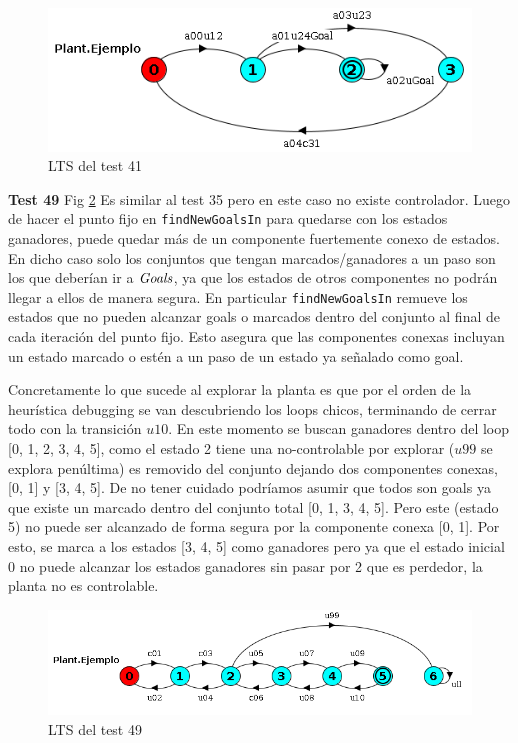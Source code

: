 \begin{figure}[h]
 \centering
 \includegraphics[scale=0.7]{figures/tests/test41.png}
 \caption{LTS del test 41}
 \label{fig:test41}
\end{figure}


\FloatBarrier
\textbf{Test 49} Fig \ref{fig:test49}
Es similar al test 35 pero en este caso no existe controlador. Luego de hacer el punto fijo en \texttt{findNewGoalsIn} para quedarse con los estados ganadores, puede quedar más de un componente fuertemente conexo de estados. En dicho caso solo los conjuntos que tengan marcados/ganadores a un paso son los que deberían ir a $\mathit{Goals}$, ya que los estados de otros componentes no podrán llegar a ellos de manera segura. En particular \texttt{findNewGoalsIn} remueve los estados que no pueden alcanzar goals o marcados dentro del conjunto al final de cada iteración del punto fijo. Esto asegura que las componentes conexas incluyan un estado marcado o estén a un paso de un estado ya señalado como goal.

Concretamente lo que sucede al explorar la planta es que por el orden de la heurística debugging se van descubriendo los loops chicos, terminando de cerrar todo con la transición $u10$. En este momento se buscan ganadores dentro del loop [0, 1, 2, 3, 4, 5], como el estado 2 tiene una no-controlable por explorar ($u99$ se explora penúltima) es removido del conjunto dejando dos componentes conexas, [0, 1] y [3, 4, 5]. De no tener cuidado podríamos asumir que todos son goals ya que existe un marcado dentro del conjunto total [0, 1, 3, 4, 5]. Pero este (estado 5) no puede ser alcanzado de forma segura por la componente conexa [0, 1]. Por esto, se marca a los estados [3, 4, 5] como ganadores pero ya que el estado inicial 0 no puede alcanzar los estados ganadores sin pasar por 2 que es perdedor, la planta no es controlable.
\begin{figure}[h]
 \centering
 \includegraphics[scale=0.7]{figures/tests/test49.png}
 \caption{LTS del test 49}
 \label{fig:test49}
\end{figure}
